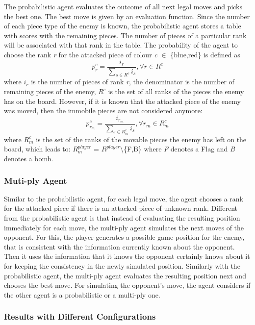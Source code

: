 \documentclass{article}
\begin{document}
The probabilistic agent evaluates the outcome of all next legal moves and picks the best one. 
The best move is given by an evaluation function. Since the number of each piece type of the enemy is known, the probabilistic agent stores a table with scores with the remaining pieces. 
The number of pieces of a particular rank will be associated with that rank in the table. 
The probability of the agent to choose the rank \textit{r} for the attacked piece of colour \textit{c} $\in$ \{blue,red\} is defined as 
$$ p_r^c = \frac{i_r}{\sum_{s \in R^c}{i_s}} , \forall r \in R^c $$ where \textit{$i_r$} is the number of pieces of rank \textit{r}, the denominator is the number of remaining pieces of the enemy, 
\textit{$R^c$} is the set of all ranks of the pieces the enemy has on the board. However, if it is known that the attacked piece of the enemy was moved, then the immobile pieces are not considered anymore: 
$$ p_{r_m}^c = \frac{i_{r_m}}{\sum_{s \in R^c_m}{i_s}} , \forall r_m \in R^c_m $$ where $R^c_m$ is the set of the ranks of the movable pieces the enemy has left on the board, 
which leads to: $R^{player}_m$ = $R^{player}$\textbackslash\{F,B\} where \textit{F} denotes a Flag and \textit{B} denotes a bomb. 

\subsubsection{Muti-ply Agent}

Similar to the probabilistic agent, for each legal move, the agent chooses a rank for the attacked piece if there is an attacked piece of unknown rank. 
Different from the probabilistic agent is that instead of evaluating the resulting position immediately for each move, the multi-ply agent simulates the next moves of the opponent. 
For this, the player generates a possible game position for the enemy, that is consistent with the information currently known about the opponent. 
Then it uses the information that it knows the opponent certainly knows about it for keeping the consistency in the newly simulated position. 
Similarly with the probabilistic agent, the multi-ply agent evaluates the resulting position next and chooses the best move. 
For simulating the opponent’s move, the agent considers if the other agent is a probabilistic or a multi-ply one. 

\subsubsection{Results with Different Configurations}
\end{document}
